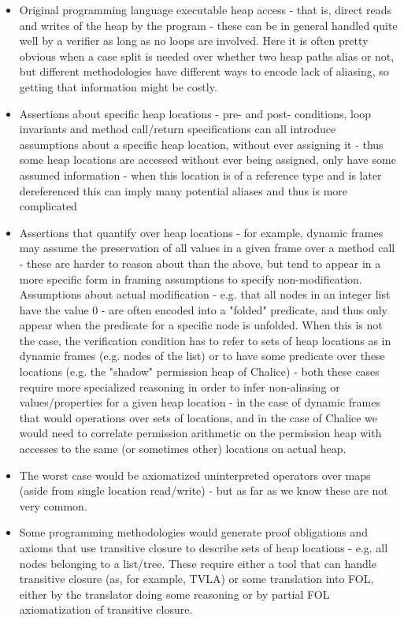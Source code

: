 	\begin{itemize}
		\item Original programming language executable heap access - that is, direct reads and writes of the heap by the program - these can be in general handled quite well by a verifier as long as no loops are involved.
		Here it is often pretty obvious when a case split is needed over whether two heap paths alias or not, but different methodologies have different ways to encode lack of aliasing, so getting that information might be costly.
		\item Assertions about specific heap locations - pre- and post- conditions, loop invariants and method call/return specifications can all introduce assumptions about a specific heap location, without ever assigning it - thus some heap locations are accessed without ever being assigned, only have some assumed information - when this location is of a reference type and is later dereferenced this can imply many potential aliases and thus is more complicated
		\item Assertions that quantify over heap locations - for example, dynamic frames may assume the preservation of all values in a given frame over a method call - these are harder to reason about than the above, but tend to appear in a more specific form in framing assumptions to specify non-modification.
		Assumptions about actual modification - e.g. that all nodes in an integer list have the value 0 - are often encoded into a "folded" predicate, and thus only appear when the predicate for a specific node is unfolded.
		When this is not the case, the verification condition has to refer to sets of heap locations as in dynamic frames (e.g. nodes of the list) or to have some predicate over these locations (e.g. the "shadow" permission heap of Chalice) - both these cases require more specialized reasoning in order to infer non-aliasing or values/properties for a given heap location - in the case of dynamic frames that would operations over sets of locations, and in the case of Chalice we would need to correlate permission arithmetic on the permission heap with accesses to the same (or sometimes other) locations on actual heap.
		\item The worst case would be axiomatized uninterpreted operators over maps (aside from single location read/write) - but as far as we know these are not very common.	
		\item Some programming methodologies would generate proof obligations and axioms that use transitive closure to describe sets of heap locations - e.g. all nodes belonging to a list/tree.
		These require either a tool that can handle transitive closure (as, for example, TVLA) or some translation into FOL, either by the translator doing some reasoning or by partial FOL axiomatization of transitive closure.
		\end{itemize}
